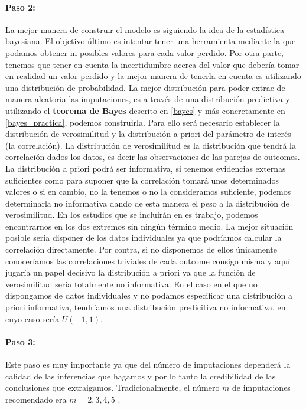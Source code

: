 \documentclass[a4paper,openright,12pt]{report}
\begin{document}
\paragraph{Paso 2:}
La mejor manera de construir el modelo es siguiendo la idea de la estadística bayesiana. El objetivo último es intentar tener una herramienta mediante la que podamos obtener m posibles valores para cada valor perdido. Por otra parte, tenemos que tener en cuenta la incertidumbre acerca del valor que debería tomar en realidad un valor perdido y la mejor manera de tenerla en cuenta es utilizando una distribución de probabilidad.
La mejor distribución para poder extrae de manera aleatoria las imputaciones, es a través de una distribución predictiva y utilizando el \textbf{teorema de Bayes} descrito en \ref{bayes} y más concretamente en \ref{bayes_practica}, podemos construirla. Para ello será necesario establecer la distribución de verosimilitud y la distribución a priori del parámetro de interés (la correlación).
La distribución de verosimilitud es la distribución que tendrá la correlación dados los datos, es decir las observaciones de las parejas de outcomes. La distribución a priori podrá ser informativa, si tenemos evidencias externas suficientes como para suponer que la correlación tomará unos determinados valores o si en cambio, no la tenemos o no la consideramos suficiente, podemos determinarla no informativa dando de esta manera el peso a la distribución de verosimilitud.
En los estudios que se incluirán en es trabajo, podemos encontrarnos en los dos extremos sin ningún término medio. La mejor situación posible sería disponer de los datos individuales ya que podríamos calcular la correlación directamente. Por contra, si no disponemos de ellos únicamente conoceríamos las correlaciones triviales de cada outcome consigo misma y aquí jugaría un papel decisivo la distribución a priori ya que la función de verosimilitud sería totalmente no informativa. En el caso en el que no dispongamos de datos individuales y no podamos especificar una distribución a priori informativa, tendríamos una distribución predicitiva no informativa, en cuyo caso sería $U\left( -1,1\right)$. 

\paragraph{Paso 3:}

Este paso es muy importante ya que del número de imputaciones dependerá la calidad de las inferencias que hagamos y por lo tanto la credibilidad de las conclusiones que extraigamos. Tradicionalmente, el número $m$ de imputaciones recomendado era $m=2,3,4,5$ \cite{Rubin1987}\cite{Rubin1996}\cite{Schafer1997}\cite{Schafer1998}.
\end{document}

